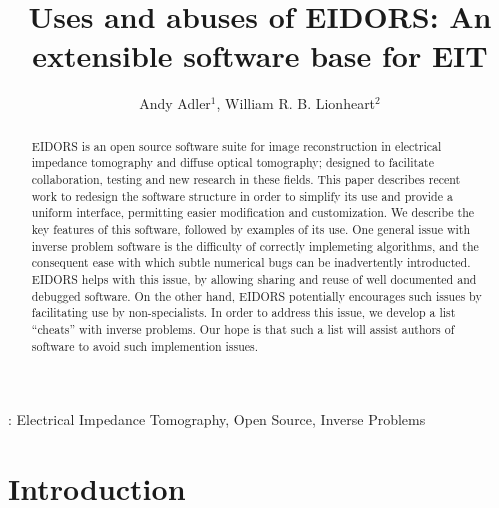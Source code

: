 \documentclass[12pt]{iopart}
\begin{document}
\title{Uses and abuses of EIDORS: An extensible software base for EIT}
\author{Andy Adler$^1$, William R. B. Lionheart$^2$}
\address{$^1$ School of Information Technology and Engineering,
              University of Ottawa, Canada}
\address{$^2$ School of Mathematics, University of Manchester, U.K.}

\begin{abstract} %

EIDORS is an open source software suite for image reconstruction in
electrical impedance tomography and diffuse optical tomography;
designed to facilitate collaboration, testing and new research
in these fields.  This paper describes recent work to
redesign the software structure in order to simplify its use
and provide a uniform interface,
permitting easier modification and customization.
We describe the key features of this software, followed by
examples of its use.
One general issue with inverse problem software is the difficulty
of correctly implemeting algorithms, and the consequent ease with
which subtle numerical bugs can be inadvertently introducted.
EIDORS helps with this issue, by allowing sharing and reuse
of well documented and debugged software. On the other hand, 
EIDORS potentially encourages such issues by facilitating use
by non-specialists. In order to address this issue, we develop
a list ``cheats'' with inverse problems. Our hope is that such
a list will assist authors of software to avoid such implemention
issues.


\end{abstract}
:
Electrical Impedance Tomography,
Open Source,
Inverse Problems

\section{Introduction}
\end{document}

